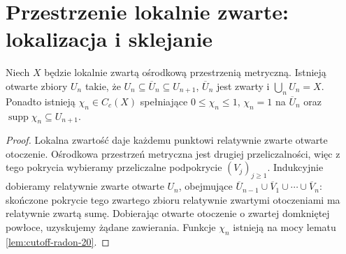 \section{Przestrzenie lokalnie zwarte: lokalizacja i sklejanie}
\begin{lemat}
\label{lem:exhaustion-21}
Niech $X$ będzie lokalnie zwartą ośrodkową przestrzenią
metryczną. Istnieją otwarte zbiory $U_n$ takie, że
$U_n\subseteq\overline U_n\subseteq U_{n+1}$,
$\overline U_n$ jest zwarty i $\bigcup_nU_n=X$.
Ponadto istnieją $\chi_n\in C_c(X)$ spełniające
$0\le\chi_n\le1$, $\chi_n=1$ na $\overline U_n$
oraz $\operatorname{supp}\chi_n\subseteq U_{n+1}$.
\end{lemat}
\begin{proof}
Lokalna zwartość daje każdemu punktowi relatywnie zwarte
otwarte otoczenie. Ośrodkowa przestrzeń metryczna jest
drugiej przeliczalności, więc z tego pokrycia wybieramy
przeliczalne podpokrycie $(V_j)_{j\ge1}$.
Indukcyjnie dobieramy relatywnie zwarte otwarte $U_n$,
obejmujące $\overline U_{n-1}\cup\overline V_1\cup\cdots
\cup\overline V_n$: skończone pokrycie tego zwartego
zbioru relatywnie zwartymi otoczeniami ma relatywnie
zwartą sumę. Dobierając otwarte otoczenie o zwartej
domkniętej powłoce, uzyskujemy żądane zawierania.
Funkcje $\chi_n$ istnieją na mocy lematu
\ref{lem:cutoff-radon-20}.
\end{proof}

